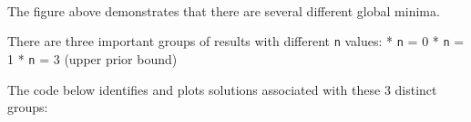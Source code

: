 \documentclass[11pt]{article}
\begin{document}
    \begin{center}
    \end{center}
    { \hspace*{\fill} \\}
    
    \begin{Verbatim}[commandchars=\\\{\}]

    \end{Verbatim}

    The figure above demonstrates that there are several different global
minima.

There are three important groups of results with different \texttt{n}
values: * \texttt{n} = 0 * \texttt{n} = 1 * \texttt{n} = 3 (upper prior
bound)

The code below identifies and plots solutions associated with these 3
distinct groups:
\end{document}

